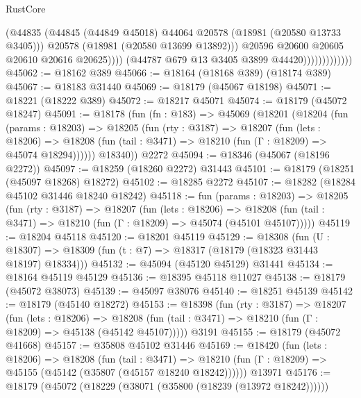 \begin{lexlean}{RustCore}
\begin{coremodule}
                                    (@44835
                                      (@44845
                                        (@44849 @45018)
                                        @44064
                                        @20578
                                        (@18981 (@20580 @13733 @3405)))
                                      @20578
                                      (@18981 (@20580 @13699 @13892)))
                                    @20596
                                    @20600
                                    @20605
                                    @20610
                                    @20616
                                    @20625))))
                            (@44787 @679 @13 @3405 @3899 @44420)))))))))))))
@45062 := @18162 @389
@45066 := @18164 (@18168 @389) (@18174 @389)
@45067 := @18183 @31440
@45069 := @18179 (@45067 @18198)
@45071 := @18221 (@18222 @389)
@45072 := @18217 @45071
@45074 := @18179 (@45072 @18247)
@45091 := @18178
    (fun (fn : @183) =>
    @45069
      (@18201
        (@18204
          (fun (params : @18203) =>
          @18205
            (fun (rty : @3187) =>
            @18207
              (fun (lets : @18206) =>
              @18208 (fun (tail : @3471) => @18210 (fun (Γ : @18209) => @45074 @18294))))))
        @18340))
    @2272
@45094 := @18346 (@45067 (@18196 @2272))
@45097 := @18259 (@18260 @2272) @31443
@45101 := @18179 (@18251 (@45097 @18268) @18272)
@45102 := @18285 @2272
@45107 := @18282 (@18284 @45102 @31446 @18240 @18242)
@45118 := fun (params : @18203) =>
  @18205
    (fun (rty : @3187) =>
    @18207
      (fun (lets : @18206) =>
      @18208 (fun (tail : @3471) => @18210 (fun (Γ : @18209) => @45074 (@45101 @45107)))))
@45119 := @18204 @45118
@45120 := @18201 @45119
@45129 := @18308
    (fun (U : @18307) => @18309 (fun (t : @7) => @18317 (@18179 (@18323 @31443 @18197) @18334)))
@45132 := @45094 (@45120 @45129) @31441
@45134 := @18164 @45119 @45129
@45136 := @18395 @45118 @11027
@45138 := @18179 (@45072 @38073)
@45139 := @45097 @38076
@45140 := @18251 @45139
@45142 := @18179 (@45140 @18272)
@45153 := @18398
    (fun (rty : @3187) =>
    @18207
      (fun (lets : @18206) =>
      @18208 (fun (tail : @3471) => @18210 (fun (Γ : @18209) => @45138 (@45142 @45107)))))
    @3191
@45155 := @18179 (@45072 @41668)
@45157 := @35808 @45102 @31446
@45169 := @18420
    (fun (lets : @18206) =>
    @18208
      (fun (tail : @3471) =>
      @18210 (fun (Γ : @18209) => @45155 (@45142 (@35807 (@45157 @18240 @18242))))))
    @13971
@45176 := @18179 (@45072 (@18229 (@38071 (@35800 (@18239 (@13972 @18242))))))

\end{coremodule}
\end{lexlean}
